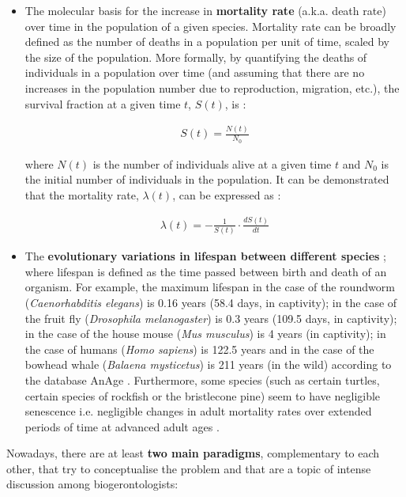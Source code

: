 \begin{itemize}
	
	\item The molecular basis for the increase in \textbf{mortality rate} (a.k.a. death rate) over time in the population of a given species. Mortality rate can be broadly defined as the number of deaths in a population per unit of time, scaled by the size of the population. More formally, by quantifying the deaths of individuals in a population over time (and assuming that there are no increases in the population number due to reproduction, migration, \acrshort{etc.}), the survival fraction at a given time $t$, $S(t)$, is \cite{Witten1986}:
	
	\begin{align} \label{eq:1.1}
	S(t) = \frac{N(t)}{N_0}
	\end{align}
	
	where $N(t)$ is the number of individuals alive at a given time $t$ and $N_0$ is the initial number of individuals in the population. It can be demonstrated that the mortality rate, $\lambda(t)$, can be expressed as \cite{Witten1986}:
	
	\begin{align} \label{eq:1.2}
	\lambda(t) = - \frac{1}{S(t)} \cdot \frac{dS(t)}{dt}
	\end{align}
	
	\item The \textbf{evolutionary variations in lifespan between different species} \cite{Jones2013}; where lifespan is defined as the time passed between birth and death of an organism. For example, the maximum lifespan in the case of the roundworm (\textit{Caenorhabditis elegans}) is 0.16 years (58.4 days, in captivity); in the case of the fruit fly (\textit{Drosophila melanogaster}) is 0.3 years (109.5 days, in captivity); in the case of the house mouse (\textit{Mus musculus}) is 4 years (in captivity); in the case of humans (\textit{Homo sapiens}) is 122.5 years and in the case of the bowhead whale (\textit{Balaena mysticetus}) is 211 years (in the wild) according to the database AnAge \cite{DEMAGALHAES2009}. Furthermore, some species (such as certain turtles, certain species of rockfish or the bristlecone pine) seem to have negligible senescence \acrshort{i.e.} negligible changes in adult mortality rates over extended periods of time at advanced adult ages \cite{Finch2009}.   
	
\end{itemize}

Nowadays, there are at least \textbf{two main paradigms}, complementary to each other, that try to conceptualise the problem and that are a topic of intense discussion among biogerontologists:

